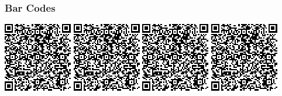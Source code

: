 \begin{frame}[fragile]
\frametitle{Bar Codes}

\includegraphics[page=1]{talk-pics}\;
\includegraphics[page=2]{talk-pics}\;
\includegraphics[page=3]{talk-pics}\;
\includegraphics[page=4]{talk-pics}

\end{frame}
